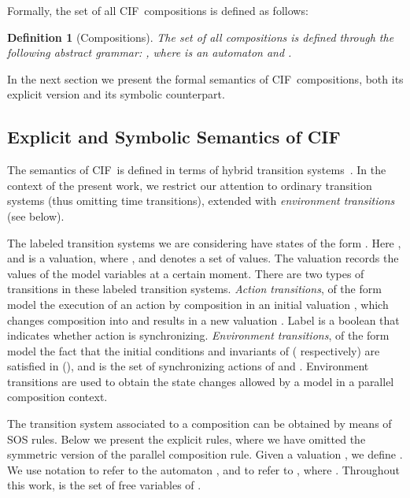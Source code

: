 \documentclass[submission,copyright,creativecommons,sharealike]{eptcs}
\newcommand{\CIF}{{CIF}}
\newtheorem{definition}{Definition}
\begin{document}
Formally, the set of all \CIF\ compositions is defined as follows:
\begin{definition}[Compositions]
  The set  of all compositions is defined through the
  following abstract grammar: ,
  where  is an automaton and .
\end{definition}


In the next section we present the formal semantics of \CIF\ compositions,
both its explicit version and  its symbolic counterpart.

\subsection{Explicit and Symbolic Semantics of \CIF}
\label{sec:expl-symb-semant}

The semantics of \CIF\ is defined in terms of hybrid transition
systems~\cite{CuijpersReniers:LostInTranslation08}.
In the context of the present work, we restrict our attention to
ordinary transition systems (thus omitting time
  transitions), extended with \emph{environment transitions} (see
below).

The labeled transition systems we are considering have states of the
form . Here , and  is a valuation, where , and  denotes a set of values. The valuation records
the values of the model variables at a certain moment.
There are two types of transitions in these labeled transition systems.
\emph{Action transitions}, of the form  model the execution of an action  by composition  in
an initial valuation , which changes composition  into 
and results in a new valuation .
Label  is a boolean that indicates whether action  is
synchronizing. \emph{Environment transitions}, of the form  model the fact that the initial
conditions and invariants of  ( respectively) are satisfied in
 (), and  is the set of synchronizing
actions of  and . Environment transitions are used to obtain
the state changes allowed by a model in a parallel composition
context.

The transition system associated to a composition can be obtained by
means of SOS rules. Below we present the explicit rules, where we have
omitted the symmetric version of the parallel composition rule. Given
a valuation , we define . We use notation  to refer to the
automaton , and  to refer to
, where . Throughout this work,  is the set of free
variables of .
\end{document}
